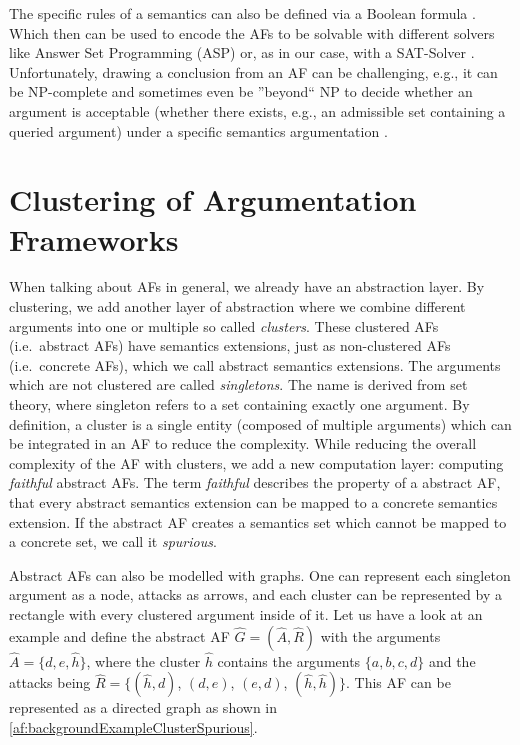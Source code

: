 The specific rules of a semantics can also be defined via a Boolean formula \cite{inproceedingsBesnardDoutreBooleanFormulaSemantics}. Which then can be used to encode the AFs to be solvable with different solvers like Answer Set Programming (ASP) \cite{BrewkaET11, DBLP:journals/argcom/EglyGW10} or, as in our case, with a SAT-Solver \cite{BacchusJM21}. Unfortunately, drawing a conclusion from an AF can be challenging, e.g., it can be NP-complete and sometimes even be ''beyond`` NP to decide whether an argument is acceptable (whether there exists, e.g., an admissible set containing a queried argument) under a specific semantics argumentation \cite{DvorakD18}.



\section{Clustering of Argumentation Frameworks}
\label{sec:ClusteringOfArgumentationFrameworks}

When talking about AFs in general, we already have an abstraction layer. By clustering, we add another layer of abstraction where we combine different arguments into one or multiple so called \emph{clusters}. These clustered AFs (i.e.\ abstract AFs) have semantics extensions, just as non-clustered AFs (i.e.\ concrete AFs), which we call abstract semantics extensions. The arguments which are not clustered are called \emph{singletons}. The name is derived from set theory, where singleton refers to a set containing exactly one argument.
By definition, a cluster is a single entity (composed of multiple arguments) which can be integrated in an AF to reduce the complexity. While reducing the overall complexity of the AF with clusters, we add a new computation layer: computing \emph{faithful} abstract AFs. The term \emph{faithful} describes the property of a abstract AF, that every abstract semantics extension can be mapped to a concrete semantics extension. If the abstract AF creates a semantics set which cannot be mapped to a concrete set, we call it \emph{spurious}.

Abstract AFs can also be modelled with graphs. One can represent each singleton argument as a node, attacks as arrows, and each cluster can be represented by a rectangle with every clustered argument inside of it. Let us have a look at an example and define the abstract AF $\hat{G}=(\hat{A}, \hat{R})$ with the arguments $\hat{A}=\{d, e, \hat{h}\}$, where the cluster $\hat{h}$ contains the arguments $\{a, b, c, d\}$ and the attacks being $\hat{R}=\bigl\{(\hat{h}, d)$, $(d, e)$, $(e, d)$, $(\hat{h},\hat{h})\bigl\}$.  This AF can be represented as a directed graph as shown in \cref{af:backgroundExampleClusterSpurious}.


